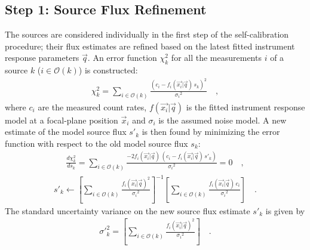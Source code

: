 \documentclass[preprint,pdftex]{aastex}
\begin{document}
\subsection{Step 1: Source Flux Refinement}
The sources are considered individually in the first step of the self-calibration procedure; their flux estimates are refined based on the latest fitted instrument response parameters $\vec{q}$. An error function $\chi^2_{k}$ for all the measurements $i$ of a source $k$ ($i \in \mathcal{O}(k)$) is constructed:
\begin{eqnarray*}
\chi^2_{k} = \sum_{i \in \mathcal{O}(k)} \frac{(c_i-f_{i}(\vec{x_i} | \vec{q}) \, s_{k})^2}{{\sigma_i}^2} \quad ,
\end{eqnarray*}
where $c_i$ are the measured count rates, $f(\vec{x_i} | \vec{q})$ is the fitted instrument response model at a focal-plane position $\vec{x}_i$ and $\sigma_i$ is the assumed noise model. A new estimate of the model source flux $s'_{k}$ is then found by minimizing the error function with respect to the old model source flux $s_{k}$:
\begin{eqnarray*}
\frac{d\chi^2_{k}}{d s_{k}} = \sum_{i \in \mathcal{O}(k)} \frac{-2 f_{i}(\vec{x_i} | \vec{q}) \, (c_i-f_{i}(\vec{x_i} | \vec{q}) \, s'_{k})}{{\sigma_i}^2} = 0 \quad ,
\end{eqnarray*}
\begin{eqnarray*}
s'_{k} \leftarrow \left[{\sum_{i \in \mathcal{O}(k)}  \frac{f_{i}(\vec{x_i} | \vec{q})^2}{{\sigma_i}^2}} \right]^{-1}  \left[ {\sum_{i \in \mathcal{O}(k)} \frac{f_{i}(\vec{x_i} | \vec{q}) \, c_i}{{\sigma_i}^2}} \right] \quad .
\end{eqnarray*}
The standard uncertainty variance on the new source flux estimate $s'_{k}$ is given by
\begin{eqnarray*}
\sigma'^2_k = \left[{\sum_{i \in \mathcal{O}(k)}  \frac{f_{i}(\vec{x_i} | \vec{q})^2}{{\sigma_i}^2}} \right] \quad .
\end{eqnarray*}
\end{document}
